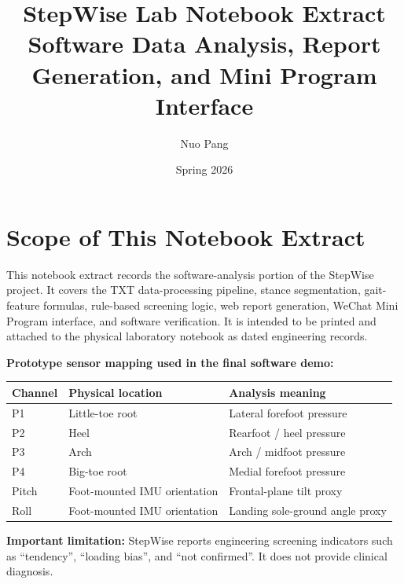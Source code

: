 \documentclass[11pt]{article}
\title{\textbf{StepWise Lab Notebook Extract}\\
\large Software Data Analysis, Report Generation, and Mini Program Interface}
\author{Nuo Pang}
\date{Spring 2026}
\begin{document}
\maketitle

\section*{Scope of This Notebook Extract}
This notebook extract records the software-analysis portion of the StepWise project. It covers the TXT data-processing pipeline, stance segmentation, gait-feature formulas, rule-based screening logic, web report generation, WeChat Mini Program interface, and software verification. It is intended to be printed and attached to the physical laboratory notebook as dated engineering records.

\textbf{Prototype sensor mapping used in the final software demo:}
\begin{center}
\begin{tabular}{lll}
\toprule
Channel & Physical location & Analysis meaning \\
\midrule
P1 & Little-toe root & Lateral forefoot pressure \\
P2 & Heel & Rearfoot / heel pressure \\
P3 & Arch & Arch / midfoot pressure \\
P4 & Big-toe root & Medial forefoot pressure \\
Pitch & Foot-mounted IMU orientation & Frontal-plane tilt proxy \\
Roll & Foot-mounted IMU orientation & Landing sole-ground angle proxy \\
\bottomrule
\end{tabular}
\end{center}

\textbf{Important limitation:} StepWise reports engineering screening indicators such as ``tendency'', ``loading bias'', and ``not confirmed''. It does not provide clinical diagnosis.

\tableofcontents
\end{document}

